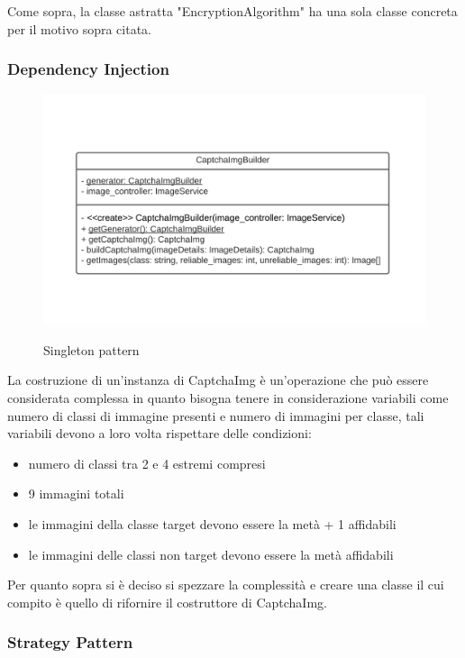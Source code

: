 Come sopra, la classe astratta "EncryptionAlgorithm" ha una sola classe concreta per il motivo sopra citata.

\subsubsection{Dependency Injection}

\begin{figure}[H]
    \centering
    \includegraphics[scale = 1.0]{img/singleton.png}\\
    \caption{Singleton pattern}
\end{figure}

La costruzione di un'instanza di CaptchaImg è un'operazione che può essere considerata complessa in quanto
bisogna tenere in considerazione variabili come numero di classi di immagine presenti e numero di immagini per classe,
tali variabili devono a loro volta rispettare delle condizioni:
\begin{itemize}
    \item numero di classi tra 2 e 4 estremi compresi
    \item 9 immagini totali
    \item le immagini della classe target devono essere la metà + 1 affidabili
    \item le immagini delle classi non target devono essere la metà affidabili
\end{itemize}
Per quanto sopra si è deciso si spezzare la complessità e creare una classe il cui compito è quello di rifornire il costruttore
di CaptchaImg. 

\subsubsection{Strategy Pattern}

